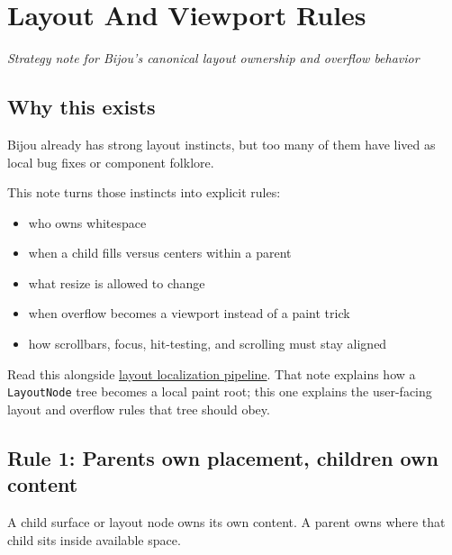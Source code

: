 \chapter{Layout And Viewport Rules}\label{record-048}

\smallskip

\emph{Strategy note for Bijou's canonical layout ownership and overflow behavior}

\section{Why this exists}\label{record-048-why-this-exists}

Bijou already has strong layout instincts, but too many of them have lived as local bug fixes or component folklore.

This note turns those instincts into explicit rules:

\begin{itemize}
\tightlist
\item
  who owns whitespace
\item
  when a child fills versus centers within a parent
\item
  what resize is allowed to change
\item
  when overflow becomes a viewport instead of a paint trick
\item
  how scrollbars, focus, hit-testing, and scrolling must stay aligned
\end{itemize}

Read this alongside \href{https://github.com/flyingrobots/bijou/blob/cbd70612140e7a450d764b3c7be1c6af878b99bc/docs/strategy/layout-localization-pipeline.md}{layout localization pipeline}. That note explains how a \texttt{L\allowbreak{}a\allowbreak{}y\allowbreak{}o\allowbreak{}u\allowbreak{}t\allowbreak{}N\allowbreak{}o\allowbreak{}d\allowbreak{}e} tree becomes a local paint root; this one explains the user-facing layout and overflow rules that tree should obey.

\section{Rule 1: Parents own placement, children own content}\label{record-048-rule-1-parents-own-placement-children-own-content}

A child surface or layout node owns its own content. A parent owns where that child sits inside available space.

